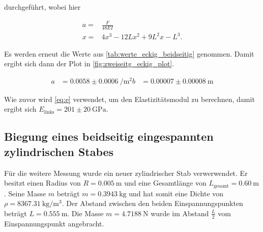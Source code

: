 durchgeführt, wobei hier 

\begin{align}
    a =& \frac{F}{48EI} \\
    x =& 4x^3 - 12Lx^2 + 9L^2x - L^3.
\end{align}

Es werden erneut die Werte aus \autoref{tab:werte_eckig_beidseitig} genommen.
Damit ergibt sich dann der Plot in \autoref{fig:zweiseitg_eckig_plot}.

\begin{align}
    a &= 0.0058 \pm \SI{0.0006}{\per \meter\squared}
    b &= 0.00007 \pm \SI{0.00008}{\meter}
\end{align}

Wie zuvor wird \autoref{eq:e} verwendet, um den Elastizitätsmodul zu berechnen, damit ergibt sich $E_\text{links} = 201 \pm \SI{20}{\giga\pascal}$.

\subsection{Biegung eines beidseitig eingespannten zylindrischen Stabes}
\label{Biegung eines beidseitig eingespannten zylindrischen Stabes}

Für die weitere Messung wurde ein neuer zylindrischer Stab verwerwendet. 
Er besitzt einen Radius von $R = \SI{0.005}{\meter}$ und eine Gesamtlänge von $L_\text{gesamt} = \SI{0.60}{\meter} $. 
Seine Masse $m$ beträgt $m = \SI{0.3943}{\kilogram}$ und hat somit eine Dichte von $\rho = \SI{8367.31}{\kilogram \per \cubic\meter}$. 
Der Abstand zwischen den beiden Einspannungspunkten beträgt $L = \SI{0.555}{\meter}$. 
Die Masse $m = \SI{4.7188}{\newton}$ wurde im Abstand $\frac{L}{2}$ vom Einspannungspunkt angebracht. 

